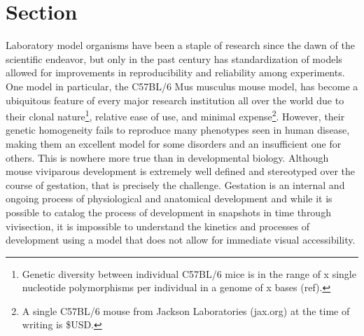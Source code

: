 



\section{Section}

Laboratory model organisms have been a staple of research since the dawn of the scientific endeavor, but only in the past century has standardization of models allowed for improvements in reproducibility and reliability among experiments. One model in particular, the C57BL/6 Mus musculus mouse model, has become a ubiquitous feature of every major research institution all over the world due to their clonal nature\footnote{Genetic diversity between individual C57BL/6 mice is in the range of x single nucleotide polymorphisms per individual in a genome of x bases (ref).}, relative ease of use, and minimal expense\footnote{A single C57BL/6 mouse from Jackson Laboratories (jax.org) at the time of writing is \$USD.}. However, their genetic homogeneity fails to reproduce many phenotypes seen in human disease, making them an excellent model for some disorders and an insufficient one for others. This is nowhere more true than in developmental biology. Although mouse viviparous development is extremely well defined and stereotyped over the course of gestation, that is precisely the challenge. Gestation is an internal and ongoing process of physiological and anatomical development and while it is possible to catalog the process of development in snapshots in time through vivisection, it is impossible to understand the kinetics and processes of development using a model that does not allow for immediate visual accessibility. 

